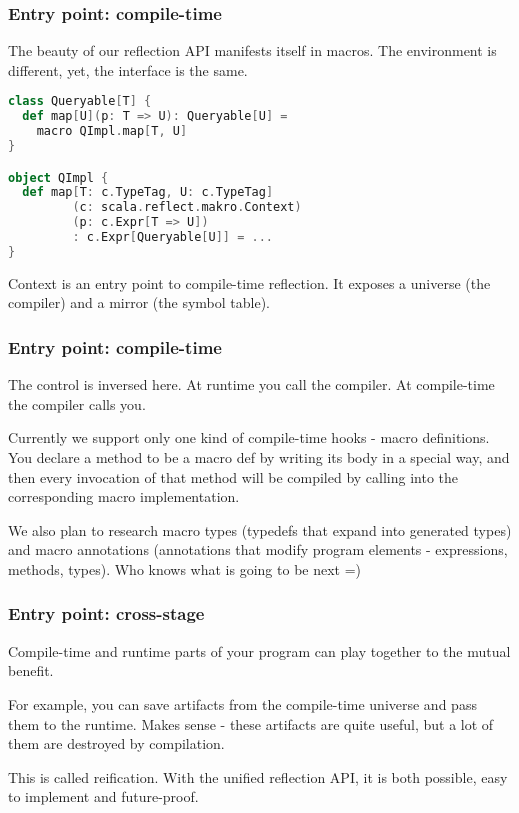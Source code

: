 \documentclass[hyperref={bookmarks=false}]{beamer}
\begin{document}
\begin{frame}[fragile]
\frametitle{Entry point: compile-time}

The beauty of our reflection API manifests itself in macros.
The environment is different, yet, the interface is the same.

\begin{lstlisting}[language=Scala]
class Queryable[T] {
  def map[U](p: T => U): Queryable[U] =
    macro QImpl.map[T, U]
}

object QImpl {
  def map[T: c.TypeTag, U: c.TypeTag]
         (c: scala.reflect.makro.Context)
         (p: c.Expr[T => U])
         : c.Expr[Queryable[U]] = ...
}
\end{lstlisting}

Context is an entry point to compile-time reflection. It exposes a universe (the compiler)
and a mirror (the symbol table).

\end{frame}

\begin{frame}[fragile]
\frametitle{Entry point: compile-time}

The control is inversed here.
At runtime you call the compiler.
At compile-time the compiler calls you.

Currently we support only one kind of compile-time hooks - macro definitions.
You declare a method to be a macro def by writing its body in a special way,
and then every invocation of that method will be compiled by calling into
the corresponding macro implementation.

We also plan to research macro types (typedefs that expand into generated types)
and macro annotations (annotations that modify program elements - expressions, methods, types).
Who knows what is going to be next =)

\end{frame}

\begin{frame}[fragile]
\frametitle{Entry point: cross-stage}

Compile-time and runtime parts of your program can play together to the mutual benefit.

For example, you can save artifacts from the compile-time universe and pass them to the runtime.
Makes sense - these artifacts are quite useful, but a lot of them are destroyed by compilation.

This is called reification. With the unified reflection API, it is both possible, easy to implement and future-proof.

\end{frame}
\end{document}
